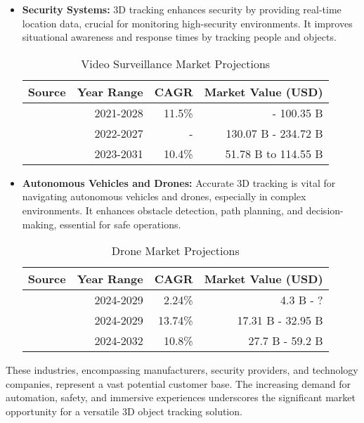 \begin{itemize}
	\item \textbf{Security Systems:} 3D tracking enhances security by providing real-time location data, crucial for monitoring high-security environments. It improves situational awareness and response times by tracking people and objects.
	
	\begin{table}[H]
		\centering
		\label{table:security}
		\begin{tabular}{lrrr}
			\hline\hline
			\textbf{Source} & \textbf{Year Range} & \textbf{CAGR} & \textbf{Market Value (USD)} \\
			\hline
			\cite{databridgemarketresearch} & 2021-2028 & 11.5\% &  - 100.35 B \\
			\cite{statista_security} & 2022-2027 & - & 130.07 B - 234.72 B \\
			\cite{theinsightpartners_security} & 2023-2031 & 10.4\% & 51.78 B to 114.55 B \\
			\hline
		\end{tabular}
		\caption{Video Surveillance Market Projections}
	\end{table}
	
	\item \textbf{Autonomous Vehicles and Drones:} Accurate 3D tracking is vital for navigating autonomous vehicles and drones, especially in complex environments. It enhances obstacle detection, path planning, and decision-making, essential for safe operations.
	
	\begin{table}[H]
		\centering
		\label{table:drones}
		\begin{tabular}{lrrr}
			\hline\hline
			\textbf{Source} & \textbf{Year Range} & \textbf{CAGR} & \textbf{Market Value (USD)} \\
			\hline
			\cite{statista_drones} & 2024-2029 & 2.24\% & 4.3 B - ? \\
			\cite{mordorintelligence_drones} & 2024-2029 & 13.74\% & 17.31 B - 32.95 B\\
			\cite{expertmarketresearch} & 2024-2032 & 10.8\% & 27.7 B - 59.2 B\\
			\hline
		\end{tabular}
		\caption{Drone Market Projections}
	\end{table}
	
\end{itemize}

These industries, encompassing manufacturers, security providers, and technology companies, represent a vast potential customer base. The increasing demand for automation, safety, and immersive experiences underscores the significant market opportunity for a versatile 3D object tracking solution.